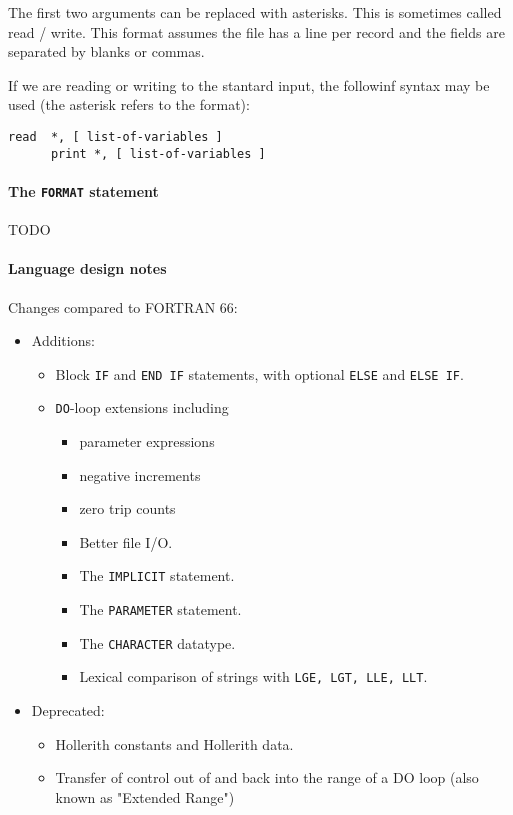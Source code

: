 The first two arguments can be replaced with asterisks. This is sometimes called  read / write. This format assumes the file has a line per record and the fields are separated by blanks or commas.

If we are reading or writing to the stantard input, the followinf syntax may be used (the asterisk refers to the format):
\begin{lstlisting}[language={[77]fortran}, style=snippet]
      read  *, [ list-of-variables ]
      print *, [ list-of-variables ]
\end{lstlisting}

\paragraph{The \texttt{FORMAT} statement} TODO

\paragraph{Language design notes}

Changes compared to FORTRAN 66:
\begin{itemize}
\item Additions:
\begin{itemize}
\item Block \texttt{IF} and \texttt{END IF} statements, with optional \texttt{ELSE} and \texttt{ELSE IF}.
\item \texttt{DO}-loop extensions including
\begin{itemize}
\item parameter expressions
\item negative increments
\item zero trip counts
\item Better file I/O.
\item The \texttt{IMPLICIT} statement.
\item The \texttt{PARAMETER} statement.
\item The \texttt{CHARACTER} datatype.
\item Lexical comparison of strings with \texttt{LGE, LGT, LLE, LLT}.
\end{itemize}
\end{itemize}
\item Deprecated:
\begin{itemize}
\item Hollerith constants and Hollerith data.
\item Transfer of control out of and back into the range of a DO loop (also known as "Extended Range")
\end{itemize}
\end{itemize}